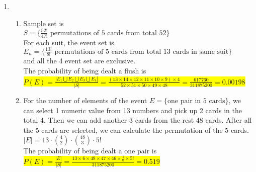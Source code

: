 \documentclass{article}
\begin{document}
\begin{enumerate}
	\item
	\begin{enumerate}
		\item
		\mysolu
		Sample set is\\
		${S=\{{\frac{52!}{47!}}\text{ permutations of 5 cards from total 52}\}}$\\
		
		For each suit, the event set is\\
		${E_n=\{{\frac{13!}{8!}}\text{ permutations of 5 cards from total 13 cards in same suit}\}}$\\
		and all the 4 event set are exclusive.\\
		\myansw
		The probability of being dealt a flush is\\
		\colorbox{yellow}{
			${
				P(E)=\frac{|E_1\bigcup E_2\bigcup E_3\bigcup E_4|}{|S|} = \frac{(13\times14\times12\times11\times10\times9)\times4}{52\times51\times50\times49\times48}=\frac{617760}{311875200}=0.00198
			}$
		}\\
		
		\item
		\mysolu
		For the number of elements of the event ${E=\{\text{one pair in 5 cards}\}}$, we can select 1 numeric value from 13 numbers and pick up 2 cards in the total 4. Then we can add another 3 cards from the rest 48 cards. After all the 5 cards are selected, we can calculate the permutation of the 5 cards.\\
		${|E|=13\cdot{4 \choose 2}\cdot{48 \choose 3} \cdot 5!}$\\
		\myansw
		The probability of being dealt a one pair is\\
		\colorbox{yellow}{
			${P(E)=\frac{|E|}{|S|}=\frac{13\times6\times48\times47\times46\times \frac{1}{6} \times 5!}{311875200}=0.519}$
		}
		

	\end{enumerate}

	
	


\end{enumerate}

\newpage
\end{document}
